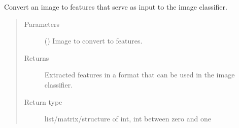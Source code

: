 \documentclass[letterpaper,10pt,english]{sphinxmanual}
\begin{document}
\begin{fulllineitems}
\label{\detokenize{data_sets:data_sets.extract_features}}
\pysigstartsignatures
{}
\pysigstopsignatures
\sphinxAtStartPar
Convert an image to features that serve as input to the image classifier.
\begin{quote}\begin{description}
\item[{Parameters}] \leavevmode
\sphinxAtStartPar
{} () \textendash{} Image to convert to features.

\item[{Returns}] \leavevmode
\sphinxAtStartPar
{} \textendash{} Extracted features in a format that can be used in the image classifier.

\item[{Return type}] \leavevmode
\sphinxAtStartPar
list/matrix/structure of int, int between zero and one

\end{description}\end{quote}

\end{fulllineitems}

\end{document}
